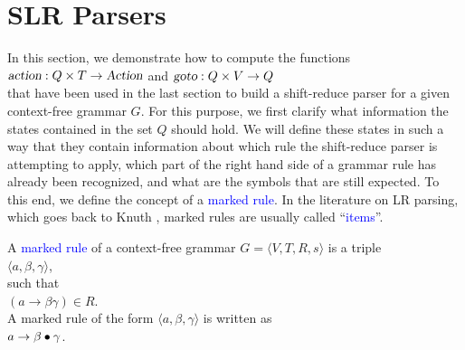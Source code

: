 \section{SLR Parsers}
In this section, we demonstrate how to compute the functions 
\\[0.2cm]
\hspace*{1.3cm}
\(\textsl{action}: Q \times T \rightarrow \textsl{Action}\) \quad and \quad \(\textsl{goto}: Q \times V \rightarrow Q\)
\\[0.2cm]
that have been used in the last section to build a shift-reduce parser for a given context-free grammar \(G\).
For this purpose, we first clarify what information the states contained in the set \(Q\) should hold. We will
define these states in such a way that they contain information about which rule the shift-reduce parser is
attempting to apply, which part of the right hand side of a grammar rule has already been recognized, and what
are the symbols that are still expected. To this end, we define the concept of a \textcolor{blue}{marked rule}.
In the literature on LR parsing, which goes back to Knuth \cite{knuth:65}, marked rules are usually called
``\textcolor{blue}{items}''.

\begin{Definition}
  A \textcolor{blue}{marked rule}  of a context-free grammar $G = \langle V, T, R, s\rangle$
  is a triple 
  \\[0.2cm]
  \hspace*{1.3cm}
  $\langle a, \beta, \gamma \rangle$,
  \\[0.2cm]
  such that
  \\[0.2cm]
  \hspace*{1.3cm}
  \((a \rightarrow \beta \gamma) \in R\).
  \\[0.2cm]
  A marked rule of the form \(\langle a, \beta, \gamma \rangle\) is written as
  \\[0.2cm]
  \hspace*{1.3cm}
  \(a \rightarrow \beta \mdot \gamma\). \eox
\end{Definition}

